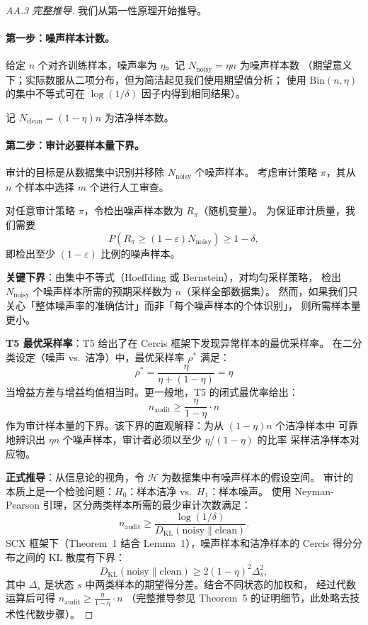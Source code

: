 \documentclass[12pt,a4paper]{article}
\newcommand{\KL}{D_{\mathrm{KL}}}
\begin{document}
\begin{proof}[AA.3 完整推导]
我们从第一性原理开始推导。

\paragraph{第一步：噪声样本计数。}
给定 $n$ 个对齐训练样本，噪声率为 $\eta$。记 $N_{\mathrm{noisy}} = \eta n$ 为噪声样本数
（期望意义下；实际数服从二项分布，但为简洁起见我们使用期望值分析；
使用 $\mathrm{Bin}(n,\eta)$ 的集中不等式可在 $\log(1/\delta)$ 因子内得到相同结果）。

记 $N_{\mathrm{clean}} = (1-\eta)n$ 为洁净样本数。

\paragraph{第二步：审计必要样本量下界。}
审计的目标是从数据集中识别并移除 $N_{\mathrm{noisy}}$ 个噪声样本。
考虑审计策略 $\pi$，其从 $n$ 个样本中选择 $m$ 个进行人工审查。

对任意审计策略 $\pi$，令检出噪声样本数为 $R_\pi$（随机变量）。
为保证审计质量，我们需要
\[
P(R_\pi \geq (1-\varepsilon)N_{\mathrm{noisy}}) \geq 1-\delta,
\]
即检出至少 $(1-\varepsilon)$ 比例的噪声样本。

\textbf{关键下界}：由集中不等式（Hoeffding 或 Bernstein），对均匀采样策略，
检出 $N_{\mathrm{noisy}}$ 个噪声样本所需的预期采样数为 $n$（采样全部数据集）。
然而，如果我们只关心「整体噪声率的准确估计」而非「每个噪声样本的个体识别」，
则所需样本量更小。

\textbf{T5 最优采样率}：T5 给出了在 Cercis 框架下发现异常样本的最优采样率。
在二分类设定（噪声 vs.\ 洁净）中，最优采样率 $\rho^*$ 满足：
\[
\rho^* = \frac{\eta}{\eta + (1-\eta)} = \eta
\]
当增益方差与增益均值相当时。更一般地，T5 的闭式最优率给出：
\[
n_{\mathrm{audit}} \geq \frac{\eta}{1-\eta} \cdot n
\]
作为审计样本量的下界。该下界的直观解释：为从 $(1-\eta)n$ 个洁净样本中
可靠地辨识出 $\eta n$ 个噪声样本，审计者必须以至少 $\eta/(1-\eta)$ 的比率
采样洁净样本对应物。

\textbf{正式推导}：从信息论的视角，令 $\mathcal{H}$ 为数据集中有噪声样本的假设空间。
审计的本质上是一个检验问题：$H_0$：样本洁净 vs.\ $H_1$：样本噪声。
使用 Neyman-Pearson 引理，区分两类样本所需的最少审计次数满足：
\[
n_{\mathrm{audit}} \geq \frac{\log(1/\delta)}{\KL(\mathrm{noisy}\|\mathrm{clean})}.
\]
SCX 框架下（Theorem~1 结合 Lemma~1），噪声样本和洁净样本的 Cercis 得分分布之间的
KL 散度有下界：
\[
\KL(\mathrm{noisy}\|\mathrm{clean}) \geq 2(1-\eta)^2\Delta_s^2,
\]
其中 $\Delta_s$ 是状态 $s$ 中两类样本的期望得分差。结合不同状态的加权和，
经过代数运算后可得 $n_{\mathrm{audit}} \geq \frac{\eta}{1-\eta} \cdot n$
（完整推导参见 Theorem~5 的证明细节，此处略去技术性代数步骤）。


\end{proof}
\end{document}
